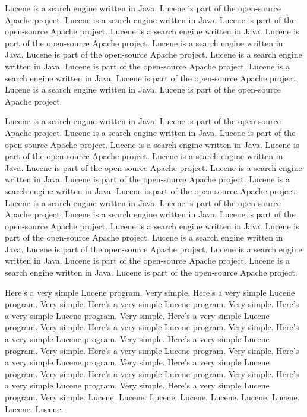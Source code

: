 \documentclass[10pt]{book}
\begin{document}
Lucene is a search engine written in Java.  Lucene is part of the
open-source Apache project.
Lucene is a search engine written in Java.  Lucene is part of the
open-source Apache project.
Lucene is a search engine written in Java.  Lucene is part of the
open-source Apache project.
Lucene is a search engine written in Java.  Lucene is part of the
open-source Apache project.
Lucene is a search engine written in Java.  Lucene is part of the
open-source Apache project.
Lucene is a search engine written in Java.  Lucene is part of the
open-source Apache project.
Lucene is a search engine written in Java.  Lucene is part of the
open-source Apache project.

Lucene is a search engine written in Java.  Lucene is part of the
open-source Apache project.
Lucene is a search engine written in Java.  Lucene is part of the
open-source Apache project.
Lucene is a search engine written in Java.  Lucene is part of the
open-source Apache project.
Lucene is a search engine written in Java.  Lucene is part of the
open-source Apache project.
Lucene is a search engine written in Java.  Lucene is part of the
open-source Apache project.
Lucene is a search engine written in Java.  Lucene is part of the
open-source Apache project.
Lucene is a search engine written in Java.  Lucene is part of the
open-source Apache project.
Lucene is a search engine written in Java.  Lucene is part of the
open-source Apache project.
Lucene is a search engine written in Java.  Lucene is part of the
open-source Apache project.
Lucene is a search engine written in Java.  Lucene is part of the
open-source Apache project.
Lucene is a search engine written in Java.  Lucene is part of the
open-source Apache project.
Lucene is a search engine written in Java.  Lucene is part of the
open-source Apache project.
%


\noindent
Here's a very simple Lucene program.  Very simple.
Here's a very simple Lucene program.  Very simple.
Here's a very simple Lucene program.  Very simple.
Here's a very simple Lucene program.  Very simple.
Here's a very simple Lucene program.  Very simple.
Here's a very simple Lucene program.  Very simple.
Here's a very simple Lucene program.  Very simple.
Here's a very simple Lucene program.  Very simple.
Here's a very simple Lucene program.  Very simple.
Here's a very simple Lucene program.  Very simple.
Here's a very simple Lucene program.  Very simple.
Here's a very simple Lucene program.  Very simple.
Here's a very simple Lucene program.  Very simple.
Here's a very simple Lucene program.  Very simple.
Lucene.
Lucene.
Lucene.
Lucene.
Lucene.
Lucene.
Lucene.
Lucene.
Lucene.
\end{document}
